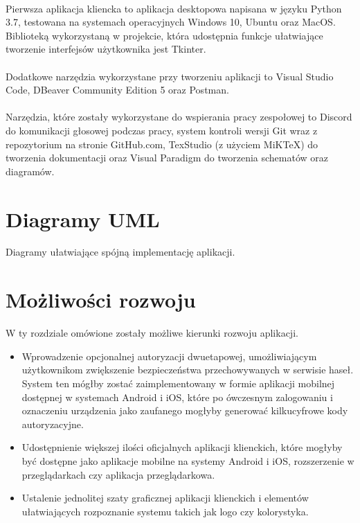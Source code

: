 \documentclass{article}
\begin{document}
	\paragraph*{} Pierwsza aplikacja kliencka to aplikacja desktopowa napisana w języku Python 3.7, testowana na systemach operacyjnych Windows 10, Ubuntu oraz MacOS. Biblioteką wykorzystaną w projekcie, która udostępnia funkcje ułatwiające tworzenie interfejsów użytkownika jest Tkinter.
	\paragraph*{} Dodatkowe narzędzia wykorzystane przy tworzeniu aplikacji to Visual Studio Code, DBeaver Community Edition 5 oraz Postman.
	\paragraph*{} Narzędzia, które zostały wykorzystane do wspierania pracy zespołowej to Discord do komunikacji głosowej podczas pracy, system kontroli wersji Git wraz z repozytorium na stronie GitHub.com, TexStudio (z użyciem MiKTeX) do tworzenia dokumentacji oraz Visual Paradigm do tworzenia schematów oraz diagramów.

    \section{Diagramy UML}
    Diagramy ułatwiające spójną implementację aplikacji.

    \section{Możliwości rozwoju}
    W ty rozdziale omówione zostały możliwe kierunki rozwoju aplikacji.

    \begin{itemize}
		\item Wprowadzenie opcjonalnej autoryzacji dwuetapowej, umożliwiającym użytkownikom zwiększenie bezpieczeństwa przechowywanych w serwisie haseł. System ten mógłby zostać zaimplementowany w formie aplikacji mobilnej dostępnej w systemach Android i iOS, które po ówczesnym zalogowaniu i oznaczeniu urządzenia jako zaufanego mogłyby generować kilkucyfrowe kody autoryzacyjne.
		\item Udostępnienie większej ilości oficjalnych aplikacji klienckich, które mogłyby być dostępne jako aplikacje mobilne na systemy Android i iOS, rozszerzenie w przeglądarkach czy aplikacja przeglądarkowa.
		\item Ustalenie jednolitej szaty graficznej aplikacji klienckich i elementów ułatwiających rozpoznanie systemu takich jak logo czy kolorystyka.
	\end{itemize}
\end{document}
